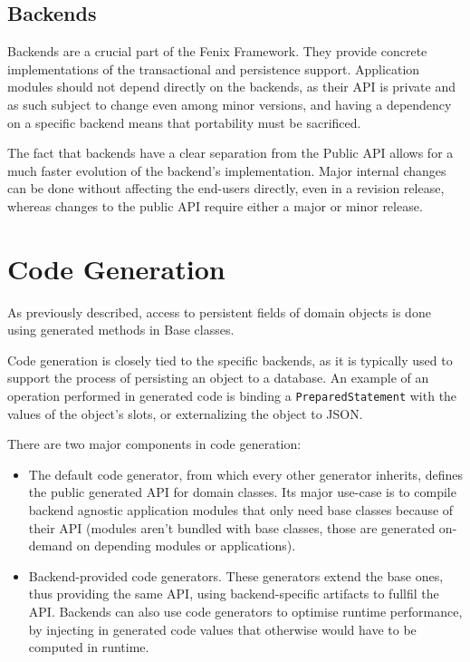 \subsection{Backends}

Backends are a crucial part of the Fenix Framework. They provide
concrete implementations of the transactional and persistence
support. Application modules should not depend directly on the
backends, as their API is private and as such subject to change even
among minor versions, and having a dependency on a specific backend
means that portability must be sacrificed.

The fact that backends have a clear separation from the Public API
allows for a much faster evolution of the backend's
implementation. Major internal changes can be done without affecting
the end-users directly, even in a revision release, whereas changes to
the public API require either a major or minor release.

\section{Code Generation}
\label{sec:codeGen}

As previously described, access to persistent fields of domain objects
is done using generated methods in Base classes.

Code generation is closely tied to the specific backends, as it is
typically used to support the process of persisting an object to a
database. An example of an operation performed in generated code is
binding a \texttt{PreparedStatement} with the values of the object's
slots, or externalizing the object to JSON.

There are two major components in code generation:

\begin{itemize}

\item The default code generator, from which every other generator
  inherits, defines the public generated API for domain classes. Its
  major use-case is to compile backend agnostic application modules
  that only need base classes because of their API (modules aren't
  bundled with base classes, those are generated on-demand on
  depending modules or applications).

\item Backend-provided code generators. These generators extend the
  base ones, thus providing the same API, using backend-specific
  artifacts to fullfil the API. Backends can also use code generators
  to optimise runtime performance, by injecting in generated code
  values that otherwise would have to be computed in runtime.
\end{itemize}

